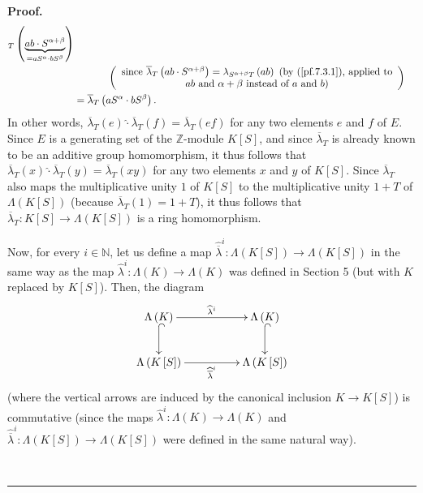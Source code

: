 \documentclass[numbers=enddot,12pt,final,onecolumn,notitlepage]{scrartcl}%
\newenvironment{proof}[1][Proof]{\noindent\textbf{#1.} }{\ \rule{0.5em}{0.5em}}
\begin{document}
\begin{proof}
\begin{align*}
{}_{T}\left(  \underbrace{ab\cdot S^{\alpha+\beta}}_{=aS^{\alpha}\cdot
bS^{\beta}}\right) \\
&  \ \ \ \ \ \ \ \ \ \ \left(
\begin{array}
[c]{c}%
\text{since }\overline{\lambda}_{T}\left(  ab\cdot S^{\alpha+\beta}\right)
=\lambda_{S^{\alpha+\beta}T}\left(  ab\right)  \text{ (by (\ref{pf.7.3.1}),
applied to}\\
ab\text{ and }\alpha+\beta\text{ instead of }a\text{ and }b\text{)}%
\end{array}
\right) \\
&  =\overline{\lambda}_{T}\left(  aS^{\alpha}\cdot bS^{\beta}\right)  .
\end{align*}
In other words, $\overline{\lambda}_{T}\left(  e\right)  \widehat{\cdot
}\overline{\lambda}_{T}\left(  f\right)  =\overline{\lambda}_{T}\left(
ef\right)  $ for any two elements $e$ and $f$ of $E$. Since $E$ is a
generating set of the $\mathbb{Z}$-module $K\left[  S\right]  $, and since
$\overline{\lambda}_{T}$ is already known to be an additive group
homomorphism, it thus follows that $\overline{\lambda}_{T}\left(  x\right)
\widehat{\cdot}\overline{\lambda}_{T}\left(  y\right)  =\overline{\lambda}%
_{T}\left(  xy\right)  $ for any two elements $x$ and $y$ of $K\left[
S\right]  $. Since $\overline{\lambda}_{T}$ also maps the multiplicative unity
$1$ of $K\left[  S\right]  $ to the multiplicative unity $1+T$ of
$\Lambda\left(  K\left[  S\right]  \right)  $ (because $\overline{\lambda}%
_{T}\left(  1\right)  =1+T$), it thus follows that $\overline{\lambda}%
_{T}:K\left[  S\right]  \rightarrow\Lambda\left(  K\left[  S\right]  \right)
$ is a ring homomorphism.

Now, for every $i\in\mathbb{N}$, let us define a map $\widehat{\overline
{\lambda}}^{i}:\Lambda\left(  K\left[  S\right]  \right)  \rightarrow
\Lambda\left(  K\left[  S\right]  \right)  $ in the same way as the map
$\widehat{\lambda}^{i}:\Lambda\left(  K\right)  \rightarrow\Lambda\left(
K\right)  $ was defined in Section 5 (but with $K$ replaced by $K\left[
S\right]  $). Then, the diagram%
\begin{equation}
\xymatrixcolsep{4pc}\xymatrix{ \Lambda\left(K\right) \ar@{^{(}->}[d] \ar[r]^{\widehat{\lambda}^i} & \Lambda\left(K\right) \ar@{^{(}->}[d] \\ \Lambda\left(K\left[S\right]\right) \ar[r]_{\widehat{\overline{\lambda}}^i} & \Lambda\left(K\left[S\right]\right) }
\label{7.3.commdiag}%
\end{equation}
(where the vertical arrows are induced by the canonical inclusion
$K\rightarrow K\left[  S\right]  $) is commutative (since the maps
$\widehat{\lambda}^{i}:\Lambda\left(  K\right)  \rightarrow\Lambda\left(
K\right)  $ and $\widehat{\overline{\lambda}}^{i}:\Lambda\left(  K\left[
S\right]  \right)  \rightarrow\Lambda\left(  K\left[  S\right]  \right)  $
were defined in the same natural way).


\end{proof}
\end{document}
